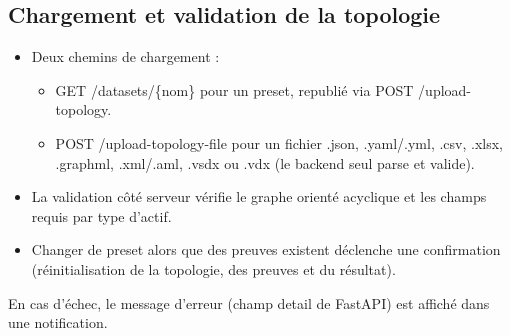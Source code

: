 \documentclass[12pt,a4paper]{article}
\newcommand{\forcereset}[1]{%
    \needspace{#1\baselineskip}%
}
\begin{document}
\subsection{Chargement et validation de la topologie}
\forcereset{4}
\begin{itemize}[leftmargin=1.2cm, itemsep=0.2\baselineskip]
    \item Deux chemins de chargement :
        \begin{itemize}
            \item GET /datasets/\{nom\} pour un preset, republié via POST /upload-topology.
            \item POST /upload-topology-file pour un fichier .json, .yaml/.yml, .csv, .xlsx, .graphml, .xml/.aml, .vsdx ou .vdx (le backend seul parse et valide).
        \end{itemize}
    \item La validation côté serveur vérifie le graphe orienté acyclique et les champs requis par type d'actif.
    \item Changer de preset alors que des preuves existent déclenche une confirmation (réinitialisation de la topologie, des preuves et du résultat).
\end{itemize}

\begin{warningbox}
En cas d'échec, le message d'erreur (champ detail de FastAPI) est affiché dans une notification.
\end{warningbox}

\newpage
\end{document}
